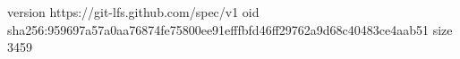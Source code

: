 version https://git-lfs.github.com/spec/v1
oid sha256:959697a57a0aa76874fe75800ee91efffbfd46ff29762a9d68c40483ce4aab51
size 3459
